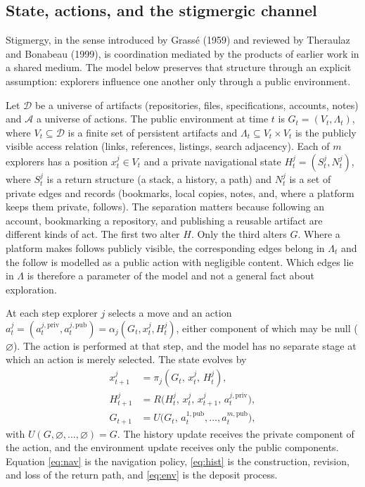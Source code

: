 \documentclass[11pt]{article}
\theoremstyle{definition}
\theoremstyle{remark}
\begin{document}
\subsection{State, actions, and the stigmergic channel}

Stigmergy, in the sense introduced by Grass\'e (1959) and reviewed by Theraulaz and Bonabeau (1999), is coordination mediated by the products of earlier work in a shared medium. The model below preserves that structure through an explicit assumption: explorers influence one another only through a public environment.

Let $\mathcal{D}$ be a universe of artifacts (repositories, files, specifications, accounts, notes) and $\mathcal{A}$ a universe of actions. The public environment at time $t$ is $G_t=(V_t,\Lambda_t)$, where $V_t\subseteq\mathcal{D}$ is a finite set of persistent artifacts and $\Lambda_t\subseteq V_t\times V_t$ is the publicly visible access relation (links, references, listings, search adjacency). Each of $m$ explorers has a position $x_t^j\in V_t$ and a private navigational state $H_t^j=(S_t^j,N_t^j)$, where $S_t^j$ is a return structure (a stack, a history, a path) and $N_t^j$ is a set of private edges and records (bookmarks, local copies, notes, and, where a platform keeps them private, follows). The separation matters because following an account, bookmarking a repository, and publishing a reusable artifact are different kinds of act. The first two alter $H$. Only the third alters $G$. Where a platform makes follows publicly visible, the corresponding edges belong in $\Lambda_t$ and the follow is modelled as a public action with negligible content. Which edges lie in $\Lambda$ is therefore a parameter of the model and not a general fact about exploration.

At each step explorer $j$ selects a move and an action $a_t^j=(a_t^{j,\mathrm{priv}},a_t^{j,\mathrm{pub}})=\alpha_j(G_t,x_t^j,H_t^j)$, either component of which may be null ($\varnothing$). The action is performed at that step, and the model has no separate stage at which an action is merely selected. The state evolves by
\begin{align}
x_{t+1}^j &= \pi_j(G_t,\,x_t^j,\,H_t^j), \label{eq:nav}\\
H_{t+1}^j &= R\bigl(H_t^j,\,x_t^j,\,x_{t+1}^j,\,a_t^{j,\mathrm{priv}}\bigr), \label{eq:hist}\\
G_{t+1} &= U\bigl(G_t,\,a_t^{1,\mathrm{pub}},\dots,a_t^{m,\mathrm{pub}}\bigr), \label{eq:env}
\end{align}
with $U(G,\varnothing,\dots,\varnothing)=G$. The history update receives the private component of the action, and the environment update receives only the public components. Equation \eqref{eq:nav} is the navigation policy, \eqref{eq:hist} is the construction, revision, and loss of the return path, and \eqref{eq:env} is the deposit process.
\end{document}
